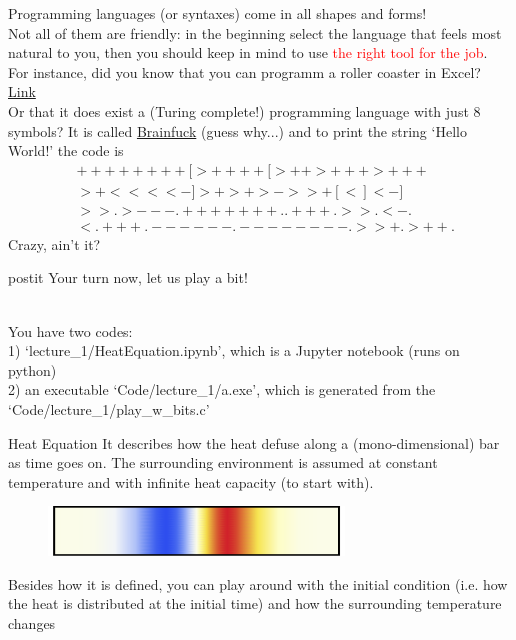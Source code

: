 \documentclass[10pt]{beamer}
\newcommand{\red}[1]{\textcolor{red}{#1}}
\renewcommand{\[}{\begin{equation*}}
\renewcommand{\]}{\end{equation*}}
\begin{document}
\begin{frame}
Programming languages (or syntaxes) come in all shapes and forms!\\
Not all of them are friendly: in the beginning select the language that feels most natural to you, then you should keep in mind to use \red{the right tool for the job}.\\
For instance, did you know that you can programm a roller coaster in Excel? \href{https://www.youtube.com/watch?v=IrVA1BBHFHw}{Link}\\
Or that it does exist a (Turing complete!) programming language with just 8 symbols? It is called \href{https://en.wikipedia.org/wiki/Brainfuck}{Brainfuck} (guess why...) and to print the string `Hello World!' the code is 
\[\begin{split}
& ++++++++[>++++[>++>+++>+++\\
& >+<<<<-]>+>+>->>+[<]<-]\\
& >>.>---.+++++++..+++.>>.<-.\\
& <.+++.------.--------.>>+.>++.
\end{split}\]
Crazy, ain't it?
\end{frame}

\begin{frame}
\begin{center}
\begin{minipage}{10cm}
\begin{beamercolorbox}[sep=1em,wd=6cm,rounded=true,shadow=true]{postit}
Your turn now, let us play a bit!
\end{beamercolorbox}\end{minipage}
\end{center}
$ $\\
You have two codes: \\
1) `lecture\_1/HeatEquation.ipynb', which is a Jupyter notebook (runs on python)\\
2) an executable `Code/lecture\_1/a.exe', which is generated from the `Code/lecture\_1/play\_w\_bits.c'
\end{frame}

\begin{frame}{Heat Equation}
It describes how the heat defuse along a (mono-dimensional) bar as time goes on. The surrounding environment is assumed at constant temperature and with infinite heat capacity (to start with).
\begin{center}
\begin{figure}
    \includegraphics[width=0.7\textwidth]{Notes/Figures/heat_bar.pdf}
\end{figure}
\end{center}

Besides how it is defined, you can play around with the initial condition (i.e. how the heat is distributed at the initial time) and how the surrounding temperature changes 

\end{frame}
\end{document}
